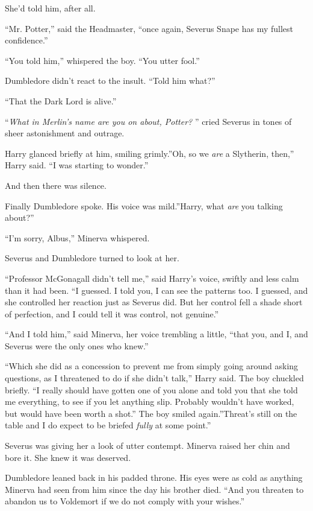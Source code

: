 She'd told him, after all.

``Mr. Potter,'' said the Headmaster, ``once again, Severus Snape has my
fullest confidence.''

``You told him,'' whispered the boy. ``You utter fool.''

Dumbledore didn't react to the insult. ``Told him what?''

``That the Dark Lord is alive.''

``\emph{What in Merlin's name are you on about, Potter?} '' cried Severus
in tones of sheer astonishment and outrage.

Harry glanced briefly at him, smiling grimly.''Oh, so we \emph{are} a
Slytherin, then,'' Harry said. ``I was starting to wonder.''

And then there was silence.

Finally Dumbledore spoke. His voice was mild.''Harry, what \emph{are}
you talking about?''

``I'm sorry, Albus,'' Minerva whispered.

Severus and Dumbledore turned to look at her.

``Professor McGonagall didn't tell me,'' said Harry's voice, swiftly and
less calm than it had been. ``I guessed. I told you, I can see the
patterns too. I guessed, and she controlled her reaction just as Severus
did. But her control fell a shade short of perfection, and I could tell
it was control, not genuine.''

``And I told him,'' said Minerva, her voice trembling a little, ``that
you, and I, and Severus were the only ones who knew.''

``Which she did as a concession to prevent me from simply going around
asking questions, as I threatened to do if she didn't talk,'' Harry
said. The boy chuckled briefly. ``I really should have gotten one of you
alone and told you that she told me everything, to see if you let
anything slip. Probably wouldn't have worked, but would have been worth
a shot.'' The boy smiled again.''Threat's still on the table and I do
expect to be briefed \emph{fully} at some point.''

Severus was giving her a look of utter contempt. Minerva raised her chin
and bore it. She knew it was deserved.

Dumbledore leaned back in his padded throne. His eyes were as cold as
anything Minerva had seen from him since the day his brother died. ``And
you threaten to abandon us to Voldemort if we do not comply with your
wishes.''


